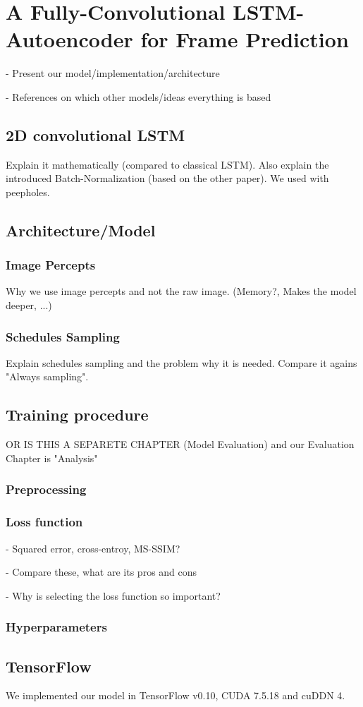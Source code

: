 \chapter{A Fully-Convolutional LSTM-Autoencoder for Frame Prediction}

- Present our model/implementation/architecture

- References on which other models/ideas everything is based

\section{2D convolutional LSTM}

Explain it mathematically (compared to classical LSTM).
Also explain the introduced Batch-Normalization (based on the other paper).
We used with peepholes.


\section{Architecture/Model}


\subsection{Image Percepts}

Why we use image percepts and not the raw image.
(Memory?, Makes the model deeper, ...)

\subsection{Schedules Sampling}

Explain schedules sampling and the problem why it is needed. Compare it agains "Always sampling".


\section{Training procedure}

OR IS THIS A SEPARETE CHAPTER (Model Evaluation) and our Evaluation Chapter is "Analysis"

\subsection{Preprocessing}

\subsection{Loss function}

- Squared error, cross-entroy, MS-SSIM?

- Compare these, what are its pros and cons

- Why is  selecting the loss function so important?

\subsection{Hyperparameters}

\section{TensorFlow}

We implemented our model in TensorFlow v0.10, CUDA 7.5.18 and cuDDN 4.




